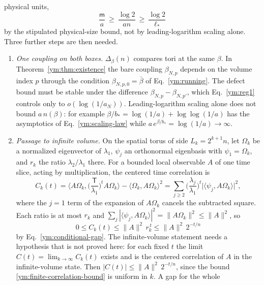 physical units,
\begin{equation}\label{ym:physical-gap}
 \frac{\mathsf m}{a}\ \ge\ \frac{\log2}{a n}
 \ \ge\ \frac{\log2}{\ell_*}
\end{equation}
by the stipulated physical-size bound, not by leading-logarithm scaling alone. Three further steps are then needed.
\begin{enumerate}
\item \emph{One coupling on both boxes.} $\Delta_\beta(n)$ compares tori at
 the same $\beta$. In Theorem~\ref{ym:thm:existence} the bare coupling
 $\beta_{N,p}$ depends on the volume index $p$ through the condition
 $\beta_{N,p,0}=\bar\beta$ of Eq.~\eqref{ym:running}. The defect bound must
 be stable under the difference $\beta_{N,p}-\beta_{N,p'}$, which
 Eq.~\eqref{ym:reg1} controls only to $o(\log(1/a_N))$. Leading-logarithm
 scaling alone does not bound $a\,n(\beta)$: for example
 $\beta/b_*=\log(1/a)+\log\log(1/a)$ has the asymptotics of
 Eq.~\eqref{ym:scaling-law} while $a\,e^{\beta/b_*}=\log(1/a)\to\infty$.
\item \emph{Passage to infinite volume.} On the spatial torus of side
 $L_k=2^{k+1}n$, let $\Omega_k$ be a normalized eigenvector of $\lambda_1$,
 $\psi_j$ an orthonormal eigenbasis with $\psi_1=\Omega_k$, and $r_k$ the
 ratio $\lambda_2/\lambda_1$ there. For a bounded local observable $A$ of one
 time slice, acting by multiplication, the centered time correlation is
 \begin{equation}\label{ym:finite-correlation}
  C_k(t)=\Big\langle A\Omega_k,\Big(\frac{\mathsf T}{\lambda_1}\Big)^tA\Omega_k
  \Big\rangle-\langle\Omega_k,A\Omega_k\rangle^2
  =\sum_{j\ge2}\Big(\frac{\lambda_j}{\lambda_1}\Big)^t
  \big|\langle\psi_j,A\Omega_k\rangle\big|^2,
 \end{equation}
 where the $j=1$ term of the expansion of $A\Omega_k$ cancels the subtracted
 square. Each ratio is at most $r_k$ and
 $\sum_j|\langle\psi_j,A\Omega_k\rangle|^2=\|A\Omega_k\|^2\le\|A\|^2$, so
 \begin{equation}\label{ym:finite-correlation-bound}
  0\le C_k(t)\le\|A\|^2\,r_k^{\,t}\le\|A\|^2\,2^{-t/n}
 \end{equation}
 by Eq.~\eqref{ym:conditional-gap}. The infinite-volume statement needs a
 hypothesis that is not proved here: for each fixed $t$ the limit
 $C(t)=\lim_{k\to\infty}C_k(t)$ exists and is the centered correlation of $A$
 in the infinite-volume state. Then
 $|C(t)|\le\|A\|^2\,2^{-t/n}$, since the bound
 \eqref{ym:finite-correlation-bound} is uniform in $k$. A gap for the whole

\end{enumerate}
